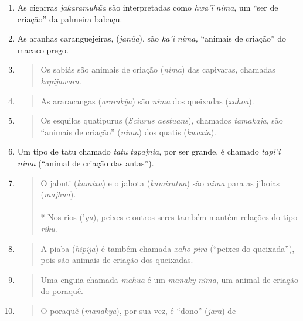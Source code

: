 \begin{enumerate}
  O pássaro chora"-chuva"-preto (\emph{Monasa} \emph{nigrifons}), chamado
  \emph{jawanĩa}, é um \emph{wari} \emph{nima}, ``animal de criação''
  para um capelão.
\item
  As cigarras \emph{jakaramuhũa} são interpretadas como \emph{hwa'ĩ}
  \emph{nima}, um ``ser de criação'' da palmeira babaçu.
\item
  As aranhas caranguejeiras, (\emph{janũa}), são \emph{ka'i}
  \emph{nima,} ``animais de criação'' do macaco prego.
\item
  \begin{quote}
  Os sabiás são animais de criação (\emph{nima}) das capivaras, chamadas
  \emph{kapijawara}.
  \end{quote}
\item
  \begin{quote}
  As araracangas (\emph{ararakỹa}) são \emph{nima} dos queixadas
  (\emph{xahoa}).
  \end{quote}
\item
  \begin{quote}
  Os esquilos quatipurus (\emph{Sciurus aestuans}), chamados
  \emph{tamakaja}, são ``animais de criação'' (\emph{nima}) dos quatis
  (\emph{kwaxia}).
  \end{quote}
\item
  Um tipo de tatu chamado \emph{tatu} \emph{tapajnia}, por ser grande, é
  chamado \emph{tapi'i} \emph{nima} (``animal de criação das antas'').
\item
  \begin{quote}
  O jabuti (\emph{kamixa}) e o jabota (\emph{kamixatua}) são \emph{nima}
  para as jiboias (\emph{majhua}).\\
  ~\\
  * Nos rios ('\emph{ya}), peixes e outros seres também mantêm relações
  do tipo \emph{riku}.
  \end{quote}
\item
  \begin{quote}
  A piaba (\emph{hipija}) é também chamada \emph{xaho pira} (``peixes do
  queixada''), pois são animais de criação dos queixadas.
  \end{quote}
\item
  \begin{quote}
  Uma enguia chamada \emph{mahua} é um \emph{manaky} \emph{nima}, um
  animal de criação do poraquê.
  \end{quote}
\item
  \begin{quote}
  O poraquê (\emph{manakya}), por sua vez, é ``dono'' (\emph{jara}) de

\end{quote}
\end{enumerate}
